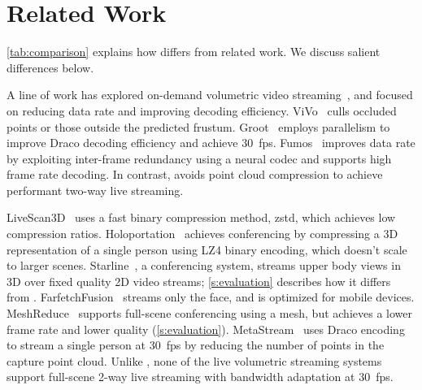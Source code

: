 \section{Related Work}
\label{s:related}

\cref{tab:comparison} explains how \livo differs from related work. We discuss salient differences below.

 A line of work has explored on-demand volumetric video streaming~\cite{vivo, groot, vues, yuzu, hermes, patchvvc}, and focused on reducing data rate and improving decoding efficiency. 
%
ViVo~\cite{vivo} culls occluded points or those outside the predicted frustum.
% 
Groot~\cite{groot} employs parallelism to improve Draco decoding efficiency and achieve 30~fps. 
%
Fumos~\cite{fumos} improves data rate by exploiting inter-frame redundancy using a neural codec and supports high frame rate decoding. 
%
In contrast, \livo avoids point cloud compression to achieve performant two-way live streaming.

%
LiveScan3D~\cite{livescan3d} uses a fast binary compression method, zstd, which achieves low compression ratios.
%
%
%
Holoportation~\cite{holoportation} achieves conferencing by compressing a 3D representation of a single person using LZ4 binary encoding, which doesn't scale to larger scenes.
%
Starline~\cite{starline}, a conferencing system, streams upper body views in 3D over fixed quality 2D video streams; \cref{s:evaluation} describes how it differs from \livo.
%
FarfetchFusion~\cite{farfetchfusion} streams only the face, and is optimized for mobile devices.
%
MeshReduce~\cite{meshreduce} supports full-scene conferencing using a mesh, but achieves a lower frame rate and lower quality (\cref{s:evaluation}).
%
MetaStream~\cite{metastream} uses Draco encoding to stream a single person at 30~fps by reducing the number of points in the capture point cloud. 
%
Unlike \livo, none of the live volumetric streaming systems support full-scene 2-way live streaming with bandwidth adaptation at 30~fps.


